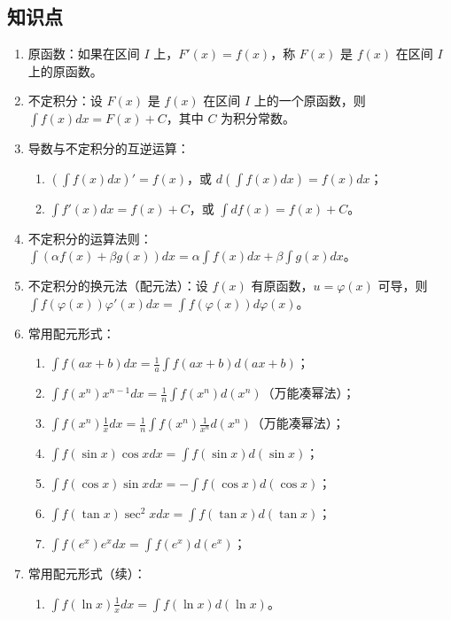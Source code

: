 \documentclass[UTF8]{ctexart}
\theoremstyle{remark}
\begin{document}
	\subsection*{知识点}
	\begin{enumerate}
		\item 原函数：如果在区间 \(I\) 上，\(F'(x) = f(x)\)，称 \(F(x)\) 是 \(f(x)\) 在区间 \(I\) 上的原函数。
		\item 不定积分：设 \(F(x)\) 是 \(f(x)\) 在区间 \(I\) 上的一个原函数，则 \(\int f(x)dx = F(x) + C\)，其中 \(C\) 为积分常数。
		\item 导数与不定积分的互逆运算：
		\begin{enumerate}
			\item \(\left(\int f(x)dx\right)' = f(x)\)，或 \(d\left(\int f(x)dx\right) = f(x)dx\)；
			\item \(\int f'(x)dx = f(x) + C\)，或 \(\int df(x) = f(x) + C\)。
		\end{enumerate}
		\item 不定积分的运算法则：\(\int(\alpha f(x) + \beta g(x))dx = \alpha \int f(x)dx + \beta \int g(x)dx\)。
		\item 不定积分的换元法（配元法）：设 \(f(x)\) 有原函数，\(u = \varphi(x)\) 可导，则 \(\int f(\varphi(x))\varphi'(x)dx = \int f(\varphi(x))d\varphi(x)\)。
		\item 常用配元形式：
		\begin{enumerate}
			\item \(\int f(ax + b)dx = \frac{1}{a}\int f(ax + b)d(ax + b)\)；
			\item \(\int f(x^n)x^{n-1}dx = \frac{1}{n}\int f(x^n)d(x^n)\)（万能凑幂法）；
			\item \(\int f(x^n)\frac{1}{x}dx = \frac{1}{n}\int f(x^n)\frac{1}{x^n}d(x^n)\)（万能凑幂法）；
			\item \(\int f(\sin x)\cos xdx = \int f(\sin x)d(\sin x)\)；
			\item \(\int f(\cos x)\sin xdx = -\int f(\cos x)d(\cos x)\)；
			\item \(\int f(\tan x)\sec^2 xdx = \int f(\tan x)d(\tan x)\)；
			\item \(\int f(e^x)e^xdx = \int f(e^x)d(e^x)\)；
		\end{enumerate}
	
	\item 常用配元形式（续）：
	\begin{enumerate}
		\item \(\int f(\ln x) \frac{1}{x}dx = \int f(\ln x)d(\ln x)\)。
	\end{enumerate}
	

\end{enumerate}
\end{document}

